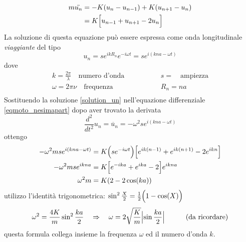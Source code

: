 \begin{equation}
\begin{split}
m \ddot{u_n} & = - K (u_n - u_{n-1}) + K (u_{n+1} - u_n) \\
& = K \Bigl[  u_{n-1} + u_{n+1} - 2 u_n  \Bigr]
\label{eqmoto_nesimapart}
\end{split}
\end{equation}
La soluzione di questa equazione può essere espressa come onda longitudinale \textit{viaggiante} del tipo
\begin{equation}
u_n = s e^{ i k R_n } e^{ - i \omega t } = s e^{ i (k n a - \omega t) }
\label{solution_un}
\end{equation}
dove
\begin{equation}
\begin{split}
k = \frac{2\pi}{\lambda} \quad \mbox{numero d'onda} \quad\quad&\quad\quad s  = \quad \mbox{ampiezza} \\
\omega = 2 \pi \nu  \quad \mbox{frequenza} \quad\quad\quad\quad&\quad\quad R_n = n a \\
\end{split}
\end{equation}
Sostituendo la soluzione \ref{solution_un} nell'equazione differenziale \ref{eqmoto_nesimapart} dopo aver trovato la derivata 
\begin{equation}
\frac{d^2}{dt^2} u_n = \ddot{u_n} = -\omega^2 s e^{ i ( k n a - \omega t ) }
\end{equation}
ottengo
\begin{equation}
\begin{split}
- \omega^2 m s e^{ i (k n a - \omega t) } & = K \Bigl(  s e^{ - i \omega t }  \Bigr) \Bigl[  e^{ i k (n-1) } + e^{ i k (n+1) } - 2 e^{ i k n } \Bigr] \\
- \omega^2 m s e^{ i k n a } & = K \Bigl[  e^{ - i k a } + e^{ i k a } - 2 \Bigr] e^{ i k n a } \\
\omega^2 m  & = K ( 2 - 2 \cos (k a) )
\end{split}
\end{equation}
utilizzo l'identità trigonometrica: $\sin^2 \frac{ X}{2 } = \frac{ 1}{2 } \Bigl(   1 - \cos(X)  \Bigr)$
\begin{equation}
\omega^2 = \frac{4 K}{m} \sin^2 \frac{k a}{2} 
\quad\Rightarrow\quad 
\omega = 2 \sqrt{\frac{K}{m}} \Bigl| \sin \frac{ka}{2}  \Bigr| \quad\quad\quad \mbox{(da ricordare)}
\label{omega}
\end{equation}
questa formula collega insieme la frequenza $\omega$ ed il numero d'onda $k$.

